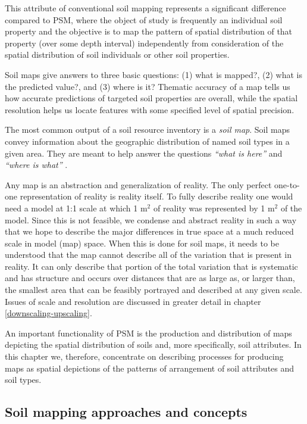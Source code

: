 \documentclass[graybox,natbib,nospthms,UStrade]{svmono}
\let\BeginKnitrBlock\begin \let\EndKnitrBlock\end
\let\BeginKnitrBlock\begin \let\EndKnitrBlock\end
\begin{document}
This attribute of conventional soil mapping represents a significant
difference compared to PSM, where the object of study is
frequently an individual soil property and the objective is to map the
pattern of spatial distribution of that property (over some depth
interval) independently from consideration of the spatial distribution
of soil individuals or other soil properties.

Soil maps give answers to three basic questions: (1) what is mapped?,
(2) what is the predicted value?, and (3) where is it? Thematic accuracy
of a map tells us how accurate predictions of targeted soil properties
are overall, while the spatial resolution helps us locate features
with some specified level of spatial precision.

\BeginKnitrBlock{rmdnote}
The most common output of a soil resource inventory is a \emph{soil map}. Soil maps convey information
about the geographic distribution of named soil types in a given area.
They are meant to help answer the questions \emph{``what is here''} and \emph{``where is what''} \citep{Burrough1998OUP}.
\EndKnitrBlock{rmdnote}

Any map is an abstraction and generalization of reality. The only
perfect one-to-one representation of reality is reality itself. To fully
describe reality one would need a model at 1:1 scale at which 1 m\(^2\) of reality
was represented by 1 m\(^2\) of the model. Since this is not feasible, we condense
and abstract reality in such a way that we hope to describe the major
differences in true space at a much reduced scale in model (map) space.
When this is done for soil maps, it needs to be understood that the map
cannot describe all of the variation that is present in reality. It can
only describe that portion of the total variation that is systematic and
has structure and occurs over distances that are as large as, or larger
than, the smallest area that can be feasibly portrayed and described at
any given scale. Issues of scale and resolution are discussed in greater
detail in chapter \ref{downscaling-upscaling}.

An important functionality of PSM is the production and distribution of
maps depicting the spatial distribution of soils and, more specifically,
soil attributes. In this chapter we, therefore, concentrate on
describing processes for producing maps as spatial depictions of the
patterns of arrangement of soil attributes and soil types.

\hypertarget{soil-mapping-approaches-and-concepts}{%
\subsection{Soil mapping approaches and concepts}\label{soil-mapping-approaches-and-concepts}}
\end{document}
